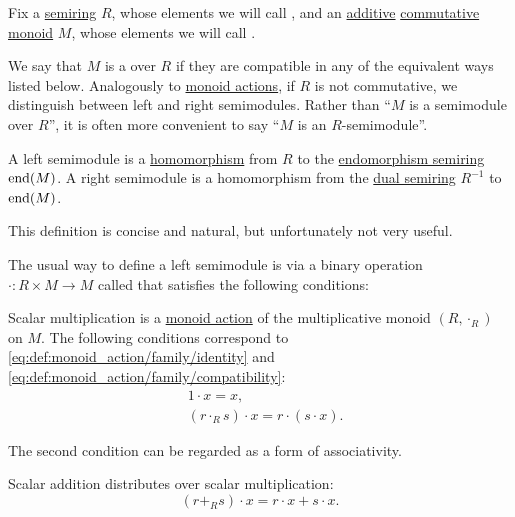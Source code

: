 \begin{definition}\label{def:semimodule}
  Fix a \hyperref[def:semiring]{semiring} \( R \), whose elements we will call , and an \hyperref[rem:additive_magma]{additive} \hyperref[def:magma/commutative]{commutative} \hyperref[def:monoid]{monoid} \( M \), whose elements we will call .

  We say that \( M \) is a  over \( R \) if they are compatible in any of the equivalent ways listed below. Analogously to \hyperref[def:monoid_action]{monoid actions}, if \( R \) is not commutative, we distinguish between left and right semimodules. Rather than \enquote{\( M \) is a semimodule over \( R \)}, it is often more convenient to say \enquote{\( M \) is an \( R \)-semimodule}.

  \begin{thmenum}[series=def:semimodule]
     A left semimodule is a \hyperref[def:semiring/homomorphism]{homomorphism} from \( R \) to the \hyperref[def:endomorphism_semiring]{endomorphism semiring} \( \operatorname{end}(M) \). A right semimodule is a homomorphism from the \hyperref[def:semiring/duality]{dual semiring} \( R^{-1} \) to \( \operatorname{end}(M) \).

    This definition is concise and natural, but unfortunately not very useful.

     The usual way to define a left semimodule is via a binary operation \( \cdot: R \times M \to M \) called  that satisfies the following conditions:
    \begin{thmenum}
       Scalar multiplication is a \hyperref[def:monoid_action]{monoid action} of the multiplicative monoid \( (R, \cdot_R) \) on \( M \). The following conditions correspond to \eqref{eq:def:monoid_action/family/identity} and \eqref{eq:def:monoid_action/family/compatibility}:
      \begin{align}
        &1 \cdot x = x, \label{eq:def:semimodule/operation/scalar_multiplication_action/identity} \\
        &(r \cdot_R s) \cdot x = r \cdot (s \cdot x). \label{eq:def:semimodule/operation/scalar_multiplication_action/compatibility}
      \end{align}

      The second condition can be regarded as a form of associativity.

       Scalar addition distributes over scalar multiplication:
      \begin{equation}\label{eq:def:semimodule/operation/scalar_addition_distributivity}
        (r +_R s) \cdot x = r \cdot x + s \cdot x.
      \end{equation}


\end{thmenum}
\end{thmenum}
\end{definition}
